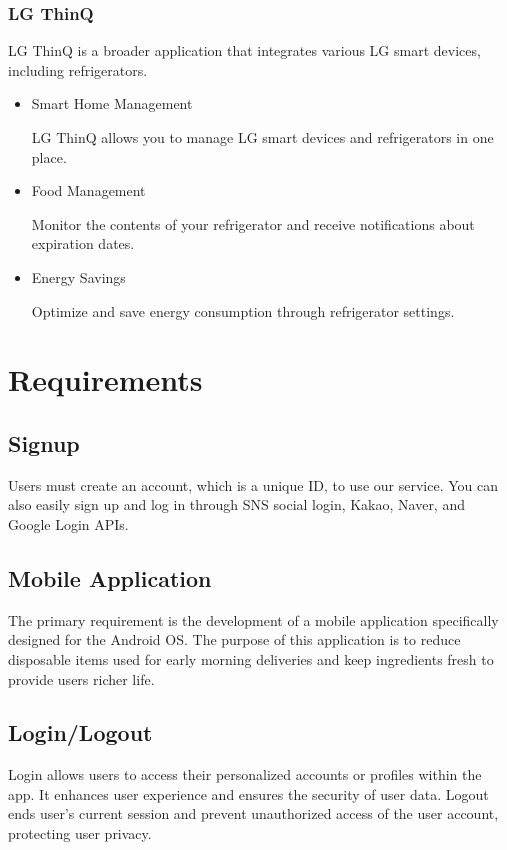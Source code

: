 \documentclass[conference]{IEEEtran}
\begin{document}
\subsubsection{LG ThinQ}
    LG ThinQ is a broader application that integrates various LG smart devices, including refrigerators.
\begin{itemize}
    \item Smart Home Management\par
    LG ThinQ allows you to manage LG smart devices and refrigerators in one place.
    \item Food Management\par
    Monitor the contents of your refrigerator and receive notifications about expiration dates.
    \item Energy Savings\par
    Optimize and save energy consumption through refrigerator settings.
    
\end{itemize}


\section{Requirements}

\subsection{Signup}
Users must create an account, which is a unique ID, to use our service. You can also easily sign up and log in through SNS social login, Kakao, Naver, and Google Login APIs. 

\subsection{Mobile Application}
The primary requirement is the development of a mobile application specifically designed for the Android OS. The purpose of this application is to reduce disposable items used for early morning deliveries and keep ingredients fresh to provide users richer life.


\subsection{Login/Logout}
Login allows users to access their personalized accounts or profiles within the app. It enhances user experience and ensures the security of user data. Logout ends user’s current session and prevent unauthorized access of the user account, protecting user privacy.
\end{document}
